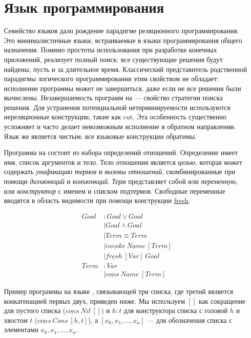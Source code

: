 \documentclass[conference]{IEEEtran}
\begin{document}
\section{Язык программирования \miniKanren{}}\label{miniKanren}

Семейство языков \miniKanren{} дало рождение парадигме реляционного программирования. 
Это минималистичные языки, встраиваемые в языки программирования общего назначения. 
Помимо простоты использования при разработке конечных приложений, \miniKanren{} реализует полный поиск: все существующие решения будут найдены, пусть и за длительное время.
Классический представитель родственной парадигмы логического программирования \prolog{} этим свойством не обладает: исполнение программы может не завершиться, даже если не все решения были вычислены. 
Незавершаемость программ на \prolog{} --- свойство стратегии поиска решения.
Для устранения потенциальной нетерминируемости используются нереляционные конструкции, такие как cut. 
Эта особенность существенно усложняет и часто делает невозможным исполнение в обратном направлении. 
Язык \miniKanren{} же является чистым: все языковые конструкции обратимы. 

Программа на \miniKanren{} состоит из набора определений отношений. 
Определение имеет имя, список аргументов и тело.
Тело отношения является \emph{целью}, которая может содержать \emph{унификацию термов} и \emph{вызовы отношений}, скомбинированные при помощи \emph{дизъюнкций} и \emph{конъюнкций}. 
\emph{Терм} представляет собой или \emph{переменную}, или \emph{конструктор} с именем и списком подтермов. 
Свободные переменные вводятся в область видимости при помощи конструкции \underline{fresh}. 

\begin{align*}
  Goal &: Goal \vee Goal \\
       &\mid Goal \wedge Goal \\
       &\mid Term \equiv Term \\
       &\mid \underline{invoke} \ Name \ [Term] \\
       &\mid \underline{fresh} \ [Var] \ Goal \\
  Term &: Var \\ 
       &\mid \underline{cons} \ Name \ [Term]
\end{align*}

Пример программы на языке \miniKanren{}, связывающей три списка, где третий является конкатенацией первых двух, приведен ниже. Мы используем $[]$ как сокращение для пустого списка ($\underline{cons} \ Nil \ []$) и $h : t$ для конструктора списка с головой $h$ и хвостом $t$ ($\underline{cons} \ Cons \ [h, t]$), а $[x_0, x_1, \dots, x_n]$ --- для обозначения списка с элементами $x_0, x_1, \dots, x_n$.
\end{document}

